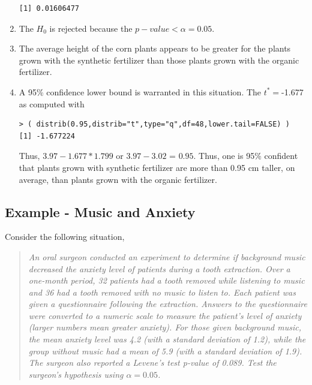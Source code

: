 \documentclass[10pt,openany]{book}\usepackage[]{graphicx}\usepackage[]{color}
\makeatletter
\newenvironment{kframe}{%
 \def\at@end@of@kframe{}%
 \ifinner\ifhmode%
  \def\at@end@of@kframe{\end{minipage}}%
  \begin{minipage}{\columnwidth}%
 \fi\fi%
 \def\FrameCommand##1{\hskip\@totalleftmargin \hskip-\fboxsep
 \colorbox{shadecolor}{##1}\hskip-\fboxsep
     \hskip-\linewidth \hskip-\@totalleftmargin \hskip\columnwidth}%
 \MakeFramed {\advance\hsize-\width
   \@totalleftmargin\z@ \linewidth\hsize
   \@setminipage}}%
 {\par\unskip\endMakeFramed%
 \at@end@of@kframe}
\newenvironment{knitrout}{}{} %
\makeatother
\begin{document}
\begin{enumerate}
\begin{knitrout}
\begin{kframe}
\begin{verbatim}
[1] 0.01606477
\end{verbatim}
\end{kframe}
\end{knitrout}
    \item The $H_{0}$ is rejected because the $p-value <\alpha=0.05$.
    \item The average height of the corn plants appears to be greater for the plants grown with the synthetic fertilizer than those plants grown with the organic fertilizer.
    \item A 95\% confidence lower bound is warranted in this situation.  The $t^{*}=$-1.677 as computed with
\begin{knitrout}
\color{fgcolor}\begin{kframe}
\begin{verbatim}
> ( distrib(0.95,distrib="t",type="q",df=48,lower.tail=FALSE) )
[1] -1.677224
\end{verbatim}
\end{kframe}
\end{knitrout}
Thus, $3.97-1.677*1.799$ or $3.97-3.02$ = $0.95$.  Thus, one is 95\% confident that plants grown with synthetic fertilizer are more than 0.95 cm taller, on average, than plants grown with the organic fertilizer.
  \end{enumerate}

\subsection{Example - Music and Anxiety}
Consider the following situation,
\begin{quote}
\textsl{An oral surgeon conducted an experiment to determine if background music decreased the anxiety level of patients during a tooth extraction.  Over a one-month period, 32 patients had a tooth removed while listening to music and 36 had a tooth removed with no music to listen to.  Each patient was given a questionnaire following the extraction.  Answers to the questionnaire were converted to a numeric scale to measure the patient's level of anxiety (larger numbers mean greater anxiety).  For those given background music, the mean anxiety level was 4.2 (with a standard deviation of 1.2), while the group without music had a mean of 5.9 (with a standard deviation of 1.9).  The surgeon also reported a Levene's test p-value of 0.089.  Test the surgeon's hypothesis using $\alpha=0.05$.}
\end{quote}
\end{document}
